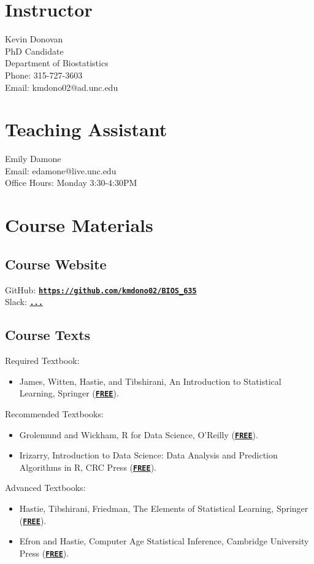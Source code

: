 \documentclass[11pt]{article}
\begin{document}
\section*{Instructor}
Kevin Donovan\\
PhD Candidate\\
Department of Biostatistics\\
Phone: 315-727-3603\\
Email: kmdono02@ad.unc.edu

\section*{Teaching Assistant}
Emily Damone\\ 
Email: edamone@live.unc.edu\\
Office Hours: Monday 3:30-4:30PM

\section*{Course Materials}
\subsection*{Course Website}
GitHub: \href{https://github.com/kmdono02/BIOS_635}{\tt\bf https://github.com/kmdono02/BIOS\_635}\\
Slack: \href{...}{\tt\bf ...}
\subsection*{Course Texts}
Required Textbook:
\begin{itemize}
\item James, Witten, Hastie, and Tibshirani, An Introduction to Statistical Learning, Springer (\href{https://statlearning.com/}{\tt\bf FREE}).
\end{itemize}
Recommended Textbooks:
\begin{itemize}
\item Grolemund and Wickham, R for Data Science, O’Reilly (\href{https://r4ds.had.co.nz/}{\tt\bf FREE}).
\item Irizarry, Introduction to Data Science: Data Analysis and Prediction Algorithms in R, CRC Press (\href{https://rafalab.github.io/dsbook/}{\tt\bf FREE}).
\end{itemize}
Advanced Textbooks:
\begin{itemize}
\item Hastie, Tibshirani, Friedman, The Elements of Statistical Learning, Springer (\href{https://web.stanford.edu/~hastie/ElemStatLearn/}{\tt\bf FREE}).
\item Efron and Hastie, Computer Age Statistical Inference, Cambridge University Press (\href{https://web.stanford.edu/~hastie/CASI_files/PDF/casi.pdf}{\tt\bf FREE}).
\end{itemize}
\end{document}
